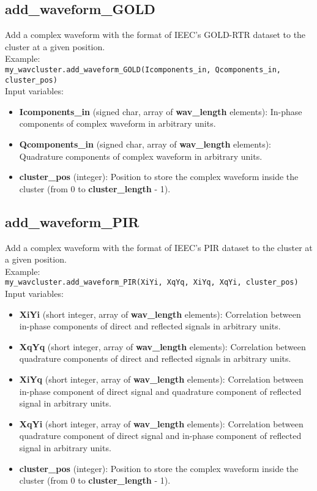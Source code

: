 \subsection{add\_waveform\_GOLD}

Add a complex waveform with the format of IEEC's GOLD-RTR dataset to the cluster at a given position.\\

Example:\\

\texttt{my\_wavcluster.add\_waveform\_GOLD(Icomponents\_in, Qcomponents\_in, cluster\_pos)}\\

Input variables:
\begin{itemize}
\item {\bf Icomponents\_in} (signed char, array of {\bf wav\_length} elements): In-phase components of complex waveform in arbitrary units.
\item {\bf Qcomponents\_in} (signed char, array of {\bf wav\_length} elements): Quadrature components of complex waveform in arbitrary units.
\item {\bf cluster\_pos} (integer): Position to store the complex waveform inside the cluster (from 0 to {\bf cluster\_length} - 1).
\end{itemize}


\subsection{add\_waveform\_PIR}

Add a complex waveform with the format of IEEC's PIR dataset to the cluster at a given position.\\

Example:\\

\texttt{my\_wavcluster.add\_waveform\_PIR(XiYi, XqYq, XiYq, XqYi, cluster\_pos)}\\

Input variables:
\begin{itemize}
\item {\bf XiYi} (short integer, array of {\bf wav\_length} elements): Correlation between in-phase components of direct and reflected signals in arbitrary units.
\item {\bf XqYq} (short integer, array of {\bf wav\_length} elements): Correlation between quadrature components of direct and reflected signals in arbitrary units.
\item {\bf XiYq} (short integer, array of {\bf wav\_length} elements): Correlation between in-phase component of direct signal and quadrature component of reflected signal in arbitrary units.
\item {\bf XqYi} (short integer, array of {\bf wav\_length} elements): Correlation between quadrature component of direct signal and in-phase component of reflected signal in arbitrary units.
\item {\bf cluster\_pos} (integer): Position to store the complex waveform inside the cluster (from 0 to {\bf cluster\_length} - 1).
\end{itemize}


